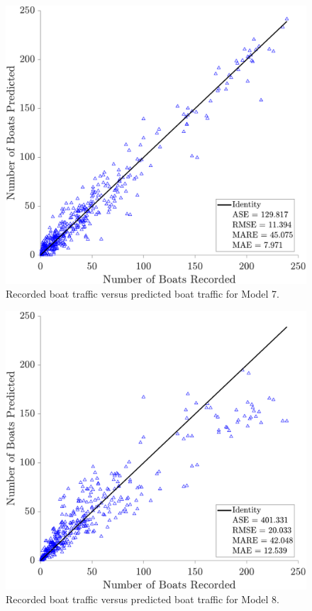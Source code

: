 \documentclass[
10pt, %
letterpaper, %
twoside, %
headinclude,footinclude, %
BCOR5mm, %
]{scrartcl}
\begin{document}
%
\begin{figure}
	\centering
	\includegraphics[width=0.65\linewidth]{figures/28-10-1.pdf}
	\caption{Recorded boat traffic versus predicted boat traffic for Model 7.} 
	\label{fig:MOD7}
\end{figure}
%
\begin{figure}
	\centering
	\includegraphics[width=0.65\linewidth]{figures/13-9-1.pdf}
	\caption{Recorded boat traffic versus predicted boat traffic for Model 8.} 
	\label{fig:MOD8}
\end{figure}
\end{document}
